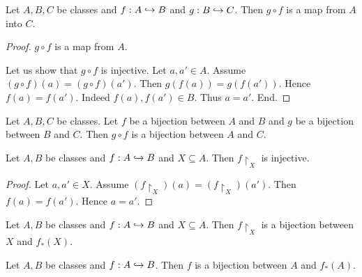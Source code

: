 \documentclass[../set-theory.tex]{subfiles}
\begin{document}
  \begin{forthel}
    \begin{proposition}\label{SET_THEORY_08_3367836856614912}
      Let $A, B, C$ be classes and $f : A \hookrightarrow B$ and $g : B \hookrightarrow C$.
      Then $g \circ f$ is a map from $A$ into $C$.
    \end{proposition}
    \begin{proof}
      $g \circ f$ is a map from $A$.

      Let us show that $g \circ f$ is injective.
        Let $a, a' \in A$.
        Assume $(g \circ f)(a) = (g \circ f)(a')$.
        Then $g(f(a)) = g(f(a'))$.
        Hence $f(a) = f(a')$.
        Indeed $f(a), f(a') \in B$.
        Thus $a = a'$.
      End.
    \end{proof}
  \end{forthel}

  \begin{forthel}
    \begin{corollary}\label{SET_THEORY_08_6435206693126144}
      Let $A, B, C$ be classes.
      Let $f$ be a bijection between $A$ and $B$ and $g$ be a bijection between $B$ and $C$.
      Then $g \circ f$ is a bijection between $A$ and $C$.
    \end{corollary}
  \end{forthel}

  \begin{forthel}
    \begin{proposition}\label{SET_THEORY_08_2621531811217408}
      Let $A, B$ be classes and $f : A \hookrightarrow B$ and $X \subseteq A$.
      Then $f \restriction_{X}$ is injective.
    \end{proposition}
    \begin{proof}
      Let $a, a' \in X$.
      Assume $(f \restriction_{X})(a) = (f \restriction_{X})(a')$.
      Then $f(a) = f(a')$.
      Hence $a = a'$.
    \end{proof}
  \end{forthel}

  \begin{forthel}
    \begin{proposition}\label{SET_THEORY_08_647446231252992}
      Let $A, B$ be classes and $f : A \hookrightarrow B$ and $X \subseteq A$.
      Then $f \restriction_{X}$ is a bijection between $X$ and $f_{*}(X)$.
    \end{proposition}
  \end{forthel}

  \begin{forthel}
    \begin{corollary}\label{SET_THEORY_08_8159443759923200}
      Let $A, B$ be classes and $f : A \hookrightarrow B$.
      Then $f$ is a bijection between $A$ and $f_{*}(A)$.
    \end{corollary}
  \end{forthel}
\end{document}
